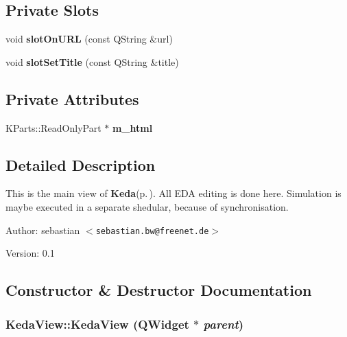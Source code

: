 \subsection*{Private Slots}
\begin{CompactItemize}
\item 
void {\bf slot\-On\-URL} (const QString \&url)
\item 
void {\bf slot\-Set\-Title} (const QString \&title)
\end{CompactItemize}
\subsection*{Private Attributes}
\begin{CompactItemize}
\item 
KParts::Read\-Only\-Part $\ast$ {\bf m\_\-html}
\end{CompactItemize}


\subsection{Detailed Description}
This is the main view of {\bf Keda}{\rm (p.\,\pageref{classKeda})}. All EDA editing is done here. Simulation is maybe executed in a separate shedular, because of synchronisation. 

\begin{Desc}
\item[Author:]sebastian $<${\tt sebastian.bw@freenet.de}$>$ \end{Desc}
\begin{Desc}
\item[Version:]0.1 \end{Desc}




\subsection{Constructor \& Destructor Documentation}
\subsubsection{\setlength{\rightskip}{0pt plus 5cm}Keda\-View::Keda\-View (QWidget $\ast$ {\em parent})}\label{classKedaView_c8e191ceb74b89413d1f51cae91cdb27}


